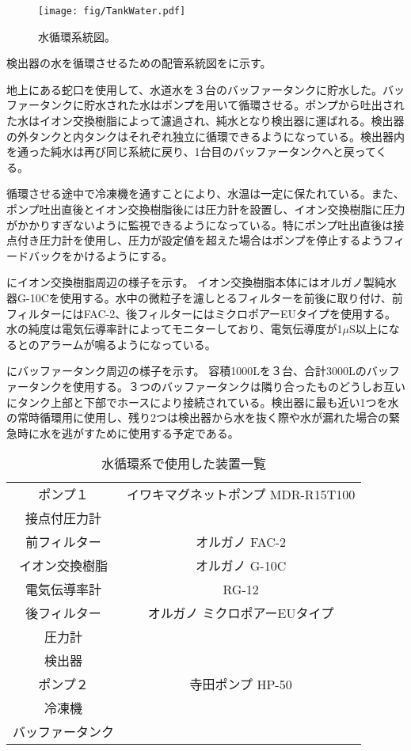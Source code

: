 \begin{figure}[htbp]
\centering
\texttt{[image: fig/TankWater.pdf]}
\caption[水循環系統図]{水循環系統図。}
\label{WaterCirculation}
\end{figure}

検出器の水を循環させるための配管系統図をに示す。

地上にある蛇口を使用して、水道水を３台のバッファータンクに貯水した。バッファータンクに貯水された水はポンプを用いて循環させる。ポンプから吐出された水はイオン交換樹脂によって濾過され、純水となり検出器に運ばれる。検出器の外タンクと内タンクはそれぞれ独立に循環できるようになっている。検出器内を通った純水は再び同じ系統に戻り、1台目のバッファータンクへと戻ってくる。

循環させる途中で冷凍機を通すことにより、水温は一定に保たれている。また、ポンプ吐出直後とイオン交換樹脂後には圧力計を設置し、イオン交換樹脂に圧力がかかりすぎないように監視できるようになっている。特にポンプ吐出直後は接点付き圧力計を使用し、圧力が設定値を超えた場合はポンプを停止するようフィードバックをかけるようにする。


にイオン交換樹脂周辺の様子を示す。
イオン交換樹脂本体にはオルガノ製純水器G-10Cを使用する。水中の微粒子を濾しとるフィルターを前後に取り付け、前フィルターにはFAC-2、後フィルターにはミクロポアーEUタイプを使用する。水の純度は電気伝導率計によってモニターしており、電気伝導度が1$\mu$S以上になるとのアラームが鳴るようになっている。

にバッファータンク周辺の様子を示す。
容積1000Lを３台、合計3000Lのバッファータンクを使用する。３つのバッファータンクは隣り合ったものどうしお互いにタンク上部と下部でホースにより接続されている。検出器に最も近い1つを水の常時循環用に使用し、残り2つは検出器から水を抜く際や水が漏れた場合の緊急時に水を逃がすために使用する予定である。

\begin{table}[htdp]
\caption[水循環系で使用した装置一覧]{水循環系で使用した装置一覧}
\begin{center}
\begin{tabular}{cc}
\hline \hline
ポンプ１ & イワキマグネットポンプ MDR-R15T100\\
接点付圧力計 & \\
前フィルター & オルガノ FAC-2\\
イオン交換樹脂 & オルガノ G-10C\\
電気伝導率計 & RG-12\\
後フィルター & オルガノ ミクロポアーEUタイプ\\
圧力計 & \\
検出器 & \\
ポンプ２ & 寺田ポンプ HP-50\\
冷凍機 & \\
バッファータンク & \\
\hline \hline
\end{tabular}
\end{center}
\label{WaterEquip}
\end{table}%
\fi



